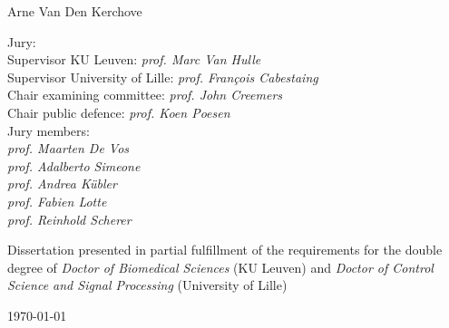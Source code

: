 \begin{titlepage}
{\begin{minipage}{.8\textwidth}
        {%
          \Large
          Arne  Van Den Kerchove
        }

      \end{minipage}%
    }

    \vfill
    \begin{minipage}[b]{.5\textwidth}
      Jury: \\
      Supervisor KU Leuven: \emph{prof. Marc Van Hulle} \\
      Supervisor University of Lille: \emph{prof. François Cabestaing} \\
      Chair examining committee: \emph{prof. John Creemers} \\
      Chair public defence: \emph{prof. Koen Poesen} \\
      Jury members: \\
      \emph{prof. Maarten De Vos} \\
      \emph{prof. Adalberto Simeone} \\
      \emph{prof. Andrea K\"ubler} \\
      \emph{prof. Fabien Lotte} \\
      \emph{prof. Reinhold Scherer}
    \end{minipage}\hfill%
    \begin{minipage}[b]{.31\textwidth}\raggedright
        Dissertation presented in partial fulfillment of the requirements for
        the double degree of \emph{Doctor of Biomedical Sciences} (KU Leuven)
        and \emph{Doctor of Control Science and Signal Processing} (University
        of Lille)
    \end{minipage}
    \bigskip

    \centering\today

\end{titlepage}
\restoregeometry
